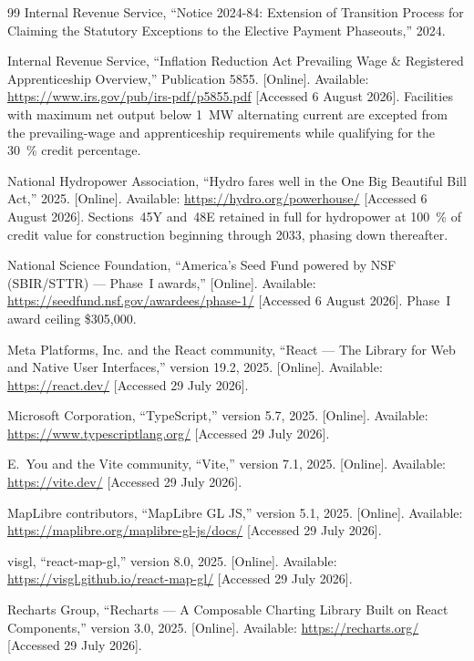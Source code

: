 \documentclass[12pt,letterpaper]{report}
\begin{document}
\begin{thebibliography}{99}
Internal Revenue Service,
``Notice 2024-84: Extension of Transition Process for Claiming the Statutory
Exceptions to the Elective Payment Phaseouts,'' 2024.

Internal Revenue Service,
``Inflation Reduction Act Prevailing Wage \& Registered Apprenticeship Overview,''
Publication 5855.
[Online]. Available: \url{https://www.irs.gov/pub/irs-pdf/p5855.pdf}
[Accessed 6 August 2026]. Facilities with maximum net output below 1~MW alternating
current are excepted from the prevailing-wage and apprenticeship requirements while
qualifying for the 30~\% credit percentage.

National Hydropower Association,
``Hydro fares well in the One Big Beautiful Bill Act,''
2025. [Online]. Available: \url{https://hydro.org/powerhouse/}
[Accessed 6 August 2026]. Sections~45Y and~48E retained in full for hydropower at
100~\% of credit value for construction beginning through 2033, phasing down
thereafter.

National Science Foundation,
``America's Seed Fund powered by NSF (SBIR/STTR) --- Phase~I awards,''
[Online]. Available: \url{https://seedfund.nsf.gov/awardees/phase-1/}
[Accessed 6 August 2026]. Phase~I award ceiling \$305,000.

Meta Platforms, Inc. and the React community,
``React --- The Library for Web and Native User Interfaces,'' version 19.2,
2025. [Online]. Available: \url{https://react.dev/}
[Accessed 29 July 2026].

Microsoft Corporation,
``TypeScript,'' version 5.7, 2025.
[Online]. Available: \url{https://www.typescriptlang.org/}
[Accessed 29 July 2026].

E.~You and the Vite community,
``Vite,'' version 7.1, 2025.
[Online]. Available: \url{https://vite.dev/}
[Accessed 29 July 2026].

MapLibre contributors,
``MapLibre GL JS,'' version 5.1, 2025.
[Online]. Available: \url{https://maplibre.org/maplibre-gl-js/docs/}
[Accessed 29 July 2026].

visgl,
``react-map-gl,'' version 8.0, 2025.
[Online]. Available: \url{https://visgl.github.io/react-map-gl/}
[Accessed 29 July 2026].

Recharts Group,
``Recharts --- A Composable Charting Library Built on React Components,''
version 3.0, 2025.
[Online]. Available: \url{https://recharts.org/}
[Accessed 29 July 2026].

\end{thebibliography}
\end{document}
